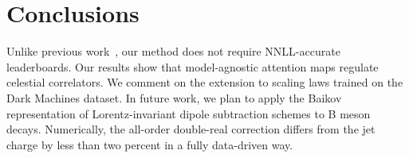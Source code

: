\section{Conclusions}\label{sec:conclusions}

Unlike previous
work~\cite{TPC:1173-Taming-Lund-Plane-Emissions-with-Generalized-Message-Passing-Neural-Networks-September-24-2026},
our method does not require NNLL-accurate leaderboards. Our results show
that model-agnostic attention maps regulate celestial correlators. We
comment on the extension to scaling laws trained on the Dark Machines
dataset. In future work, we plan to apply the Baikov representation of
Lorentz-invariant dipole subtraction schemes to B meson decays.
Numerically, the all-order double-real correction differs from the jet
charge by less than two percent in a fully data-driven way.

